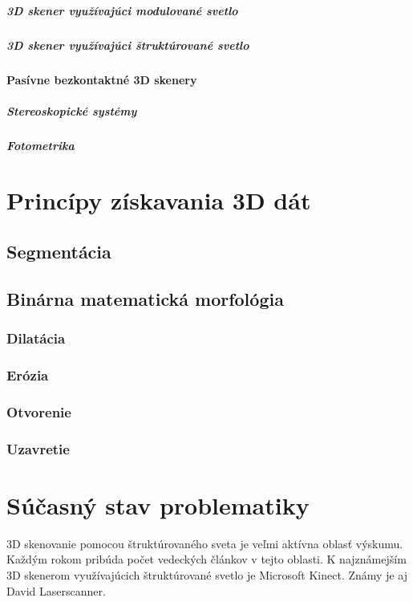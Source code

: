 \documentclass[thesismargins, thesislinespacing, twoside, upjsfrontpage]{rnthesis}
\begin{document}
\paragraph{3D skener využívajúci modulované svetlo}
\paragraph{3D skener využívajúci štruktúrované svetlo}
\subsubsection{Pasívne bezkontaktné 3D skenery}
\paragraph{Stereoskopické systémy}
\paragraph{Fotometrika}

\chapter{Princípy získavania 3D dát}
\section{Segmentácia}
\section{Binárna matematická morfológia}
\subsection{Dilatácia}
\subsection{Erózia}
\subsection{Otvorenie}
\subsection{Uzavretie}

\chapter{Súčasný stav problematiky}
3D skenovanie pomocou štruktúrovaného sveta je veľmi aktívna oblasť výskumu. Každým rokom pribúda počet vedeckých článkov v tejto oblasti. K najznámejším 3D skenerom využívajúcich štruktúrované svetlo je Microsoft Kinect. Známy je aj David Laserscanner.
\end{document}
